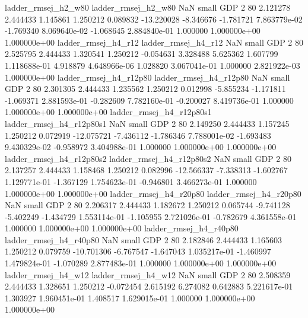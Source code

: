      ladder_rmsej_h2_w80      ladder_rmsej_h2_w80                   NaN      small      GDP                 2 80 2.121278       2.444433 1.145861       1.250212    0.089832    -13.220028     -8.346676    -1.781721   7.863779e-02 -1.769340 8.069640e-02    -1.068645   2.884840e-01            1.000000    1.000000e+00        1.000000e+00
     ladder_rmsej_h4_r12      ladder_rmsej_h4_r12                   NaN      small      GDP                 2 80 2.525795       2.444433 1.320541       1.250212   -0.054631      3.328488      5.625362     1.607799   1.118688e-01  4.918879 4.648966e-06     1.028820   3.067041e-01            1.000000    2.821922e-03        1.000000e+00
  ladder_rmsej_h4_r12p80   ladder_rmsej_h4_r12p80                   NaN      small      GDP                 2 80 2.301305       2.444433 1.235562       1.250212    0.012998     -5.855234     -1.171811    -1.069371   2.881593e-01 -0.282609 7.782160e-01    -0.200027   8.419736e-01            1.000000    1.000000e+00        1.000000e+00
ladder_rmsej_h4_r12p80s1 ladder_rmsej_h4_r12p80s1                   NaN      small      GDP                 2 80 2.149250       2.444433 1.157245       1.250212    0.072919    -12.075721     -7.436112    -1.786346   7.788001e-02 -1.693483 9.430329e-02    -0.958972   3.404988e-01            1.000000    1.000000e+00        1.000000e+00
ladder_rmsej_h4_r12p80s2 ladder_rmsej_h4_r12p80s2                   NaN      small      GDP                 2 80 2.137257       2.444433 1.158468       1.250212    0.082996    -12.566337     -7.338313    -1.602767   1.129771e-01 -1.367129 1.754623e-01    -0.946801   3.466273e-01            1.000000    1.000000e+00        1.000000e+00
  ladder_rmsej_h4_r20p80   ladder_rmsej_h4_r20p80                   NaN      small      GDP                 2 80 2.206317       2.444433 1.182672       1.250212    0.065744     -9.741128     -5.402249    -1.434729   1.553114e-01 -1.105955 2.721026e-01    -0.782679   4.361558e-01            1.000000    1.000000e+00        1.000000e+00
  ladder_rmsej_h4_r40p80   ladder_rmsej_h4_r40p80                   NaN      small      GDP                 2 80 2.182846       2.444433 1.165603       1.250212    0.079759    -10.701306     -6.767547    -1.647043   1.035217e-01 -1.460997 1.479824e-01    -1.070289   2.877483e-01            1.000000    1.000000e+00        1.000000e+00
     ladder_rmsej_h4_w12      ladder_rmsej_h4_w12                   NaN      small      GDP                 2 80 2.508359       2.444433 1.328651       1.250212   -0.072454      2.615192      6.274082     0.642883   5.221617e-01  1.303927 1.960451e-01     1.408517   1.629015e-01            1.000000    1.000000e+00        1.000000e+00
